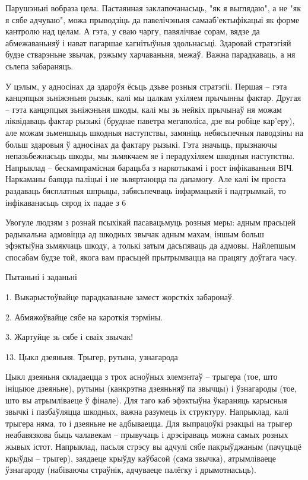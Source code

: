 Парушэньні вобраза цела. Пастаянная заклапочанасьць, "як я выглядаю", а не "як я сябе адчуваю", можа прыводзіць да павелічэньня самааб'ектыфікацыі як форме кантролю над целам. А гэта, у сваю чаргу, павялічвае сорам, вядзе да абмежаваньняў і нават пагаршае кагнітыўныя здольнасьці. Здаровай стратэгіяй будзе стварэньне звычак, рэжыму харчаваньня, межаў. Важна парадкаваць, а ня сьлепа забараняць.

У цэлым, у адносінах да здароўя ёсьць дзьве розныя стратэгіі. Першая – гэта канцэпцыя зьніжэньня рызык, калі мы цалкам ухіляем прычынны фактар. Другая – гэта канцэпцыя зьніжэньня шкоды, калі мы зь нейкіх прычынаў ня можам ліквідаваць фактар рызыкі (бруднае паветра мегаполіса, дзе вы робіце кар'еру), але можам зьменшыць шкодныя наступствы, замяніць небясьпечныя паводзіны на больш здаровыя ў адносінах да фактару рызыкі. Гэта значыць, прызнаючы непазьбежнасьць шкоды, мы зьмякчаем яе і перадухіляем шкодныя наступствы. Напрыклад – бескампрамісная барацьба з наркотыкамі і рост інфікаваньня ВІЧ. Наркаманы баяцца паліцыі і не зьвяртаюцца па дапамогу. Але калі ім проста раздаваць бясплатныя шпрыцы, забясьпечваць інфармацыяй і падтрымкай, то інфікаванасьць сярод іх падае з 6%

Увогуле людзям з рознай псыхікай пасавацьмуць розныя меры: адным прасьцей радыкальна адмовіцца ад шкодных звычак адным махам, іншым больш эфэктыўна зьмякчаць шкоду, а толькі затым дасьпяваць да адмовы. Найлепшым спосабам будзе той, якога вам прасьцей прытрымвацца на працягу доўгага часу.

Пытаньні і заданьні

1. Выкарыстоўвайце парадкаваньне замест жорсткіх забаронаў.

2. Абмяжоўвайце сябе на кароткія тэрміны.

3. Жартуйце зь сябе і сваіх звычак!


13. Цыкл дзеяньня. Трыгер, рутына, узнагарода

Цыкл дзеяньня складаецца з трох асноўных элемэнтаў – трыгера (тое, што ініцыюе дзеяньне), рутыны (канкрэтна дзеяньняў па звычцы) і ўзнагароды (тое, што вы атрымліваеце ў фінале). Для таго каб эфэктыўна ўкараняць карысныя звычкі і пазбаўляцца шкодных, важна разумець іх структуру. Напрыклад, калі трыгера няма, то і дзеяньне не адбываецца. Для выпрацоўкі рэакцыі на трыгер неабавязкова быць чалавекам – прывучаць і дрэсіраваць можна самых розных жывых істот. Напрыклад, пасьля стрэсу вы адчулі сябе пакрыўджаным (пачуцьцё крыўды – трыгер), заядаеце крыўду каўбасой (сама звычка), атрымліваеце ўзнагароду (набіваючы страўнік, адчуваеце палёгку і дрымотнасьць).

